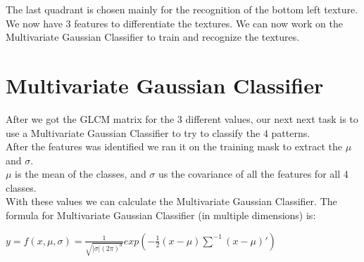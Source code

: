 \documentclass{article}
\begin{document}
The last quadrant is chosen mainly for the recognition of the bottom left texture.\\
\vspace{10px}
We now have 3 features to differentiate the textures. We can now work on the Multivariate Gaussian Classifier to train and recognize the textures. 


\section{Multivariate Gaussian Classifier}	
		After we got the GLCM matrix for the 3 different values, our next next task is to use a Multivariate Gaussian Classifier to try to classify the 4 patterns.\\
	After the features was identified we ran it on the training mask to extract the $\mu$ and $\sigma$.\\
	$\mu$ is the mean of the classes, and $\sigma$ us the covariance of all the features for all 4 classes.\\
	With these values we can calculate the Multivariate Gaussian Classifier.
	The formula for Multivariate Gaussian Classifier (in multiple dimensions) is:
	\begin{center}
		$y = f( x , \mu , \sigma)=\frac{1}{\sqrt{|\sigma|(2\pi)^{d}}}exp\left(-\frac{1}{2}(x-\mu)\sum^{-1}(x-\mu)'\right)$
	\end{center}
	
\newpage
\end{document}
